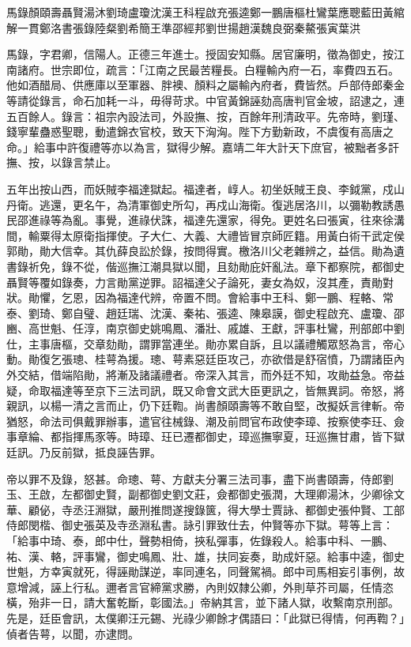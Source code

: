 
\begin{pinyinscope}
馬錄顏頤壽聶賢湯沐劉琦盧瓊沈漢王科程啟充張逵鄭一鵬唐樞杜鸞葉應聰藍田黃綰解一貫鄭洛書張錄陸粲劉希簡王準邵經邦劉世揚趙漢魏良弼秦鰲張寅葉洪

馬錄，字君卿，信陽人。正德三年進士。授固安知縣。居官廉明，徵為御史，按江南諸府。世宗即位，疏言：「江南之民最苦糧長。白糧輸內府一石，率費四五石。他如酒醋局、供應庫以至軍器、胖襖、顏料之屬輸內府者，費皆然。戶部侍郎秦金等請從錄言，命石加耗一斗，毋得苛求。中官黃錦誣劾高唐判官金坡，詔逮之，連五百餘人。錄言：祖宗內設法司，外設撫、按，百餘年刑清政平。先帝時，劉瑾、錢寧輩蠱惑聖聰，動遣錦衣官校，致天下洶洶。陛下方勤新政，不虞復有高唐之命。」給事中許復禮等亦以為言，獄得少解。嘉靖二年大計天下庶官，被黜者多訐撫、按，以錄言禁止。

五年出按山西，而妖賊李福達獄起。福達者，崞人。初坐妖賊王良、李鉞黨，戍山丹衛。逃還，更名午，為清軍御史所勾，再戍山海衛。復逃居洛川，以彌勒教誘愚民邵進祿等為亂。事覺，進祿伏誅，福達先還家，得免。更姓名曰張寅，往來徐溝間，輸粟得太原衛指揮使。子大仁、大義、大禮皆冒京師匠籍。用黃白術干武定侯郭勛，勛大信幸。其仇薛良訟於錄，按問得實。檄洛川父老雜辨之，益信。勛為遺書錄祈免，錄不從，偕巡撫江潮具獄以聞，且劾勛庇奸亂法。章下都察院，都御史聶賢等覆如錄奏，力言勛黨逆罪。詔福達父子論死，妻女為奴，沒其產，責勛對狀。勛懼，乞恩，因為福達代辨，帝置不問。會給事中王科、鄭一鵬、程輅、常泰、劉琦、鄭自璧、趙廷瑞、沈漢、秦祐、張逵、陳皋謨，御史程啟充、盧瓊、邵豳、高世魁、任淳，南京御史姚鳴鳳、潘壯、戚雄、王獻，評事杜鸞，刑部郎中劉仕，主事唐樞，交章劾勛，謂罪當連坐。勛亦累自訴，且以議禮觸眾怒為言，帝心動。勛復乞張璁、桂萼為援。璁、萼素惡廷臣攻己，亦欲借是舒宿憤，乃謂諸臣內外交結，借端陷勛，將漸及諸議禮者。帝深入其言，而外廷不知，攻勛益急。帝益疑，命取福達等至京下三法司訊，既又命會文武大臣更訊之，皆無異詞。帝怒，將親訊，以楊一清之言而止，仍下廷鞫。尚書顏頤壽等不敢自堅，改擬妖言律斬。帝猶怒，命法司俱戴罪辦事，遣官往械錄、潮及前問官布政使李璋、按察使李玨、僉事章綸、都指揮馬豕等。時璋、玨已遷都御史，璋巡撫寧夏，玨巡撫甘肅，皆下獄廷訊。乃反前獄，抵良誣告罪。

帝以罪不及錄，怒甚。命璁、萼、方獻夫分署三法司事，盡下尚書頤壽，侍郎劉玉、王啟，左都御史賢，副都御史劉文莊，僉都御史張潤，大理卿湯沐，少卿徐文華、顧佖，寺丞汪淵獄，嚴刑推問遂搜錄篋，得大學士賈詠、都御史張仲賢、工部侍郎閔楷、御史張英及寺丞淵私書。詠引罪致仕去，仲賢等亦下獄。萼等上言：「給事中琦、泰，郎中仕，聲勢相倚，挾私彈事，佐錄殺人。給事中科、一鵬、祐、漢、輅，評事鸞，御史鳴鳳、壯、雄，扶同妄奏，助成奸惡。給事中逵，御史世魁，方幸寅就死，得誣勛謀逆，率同連名，同聲駕禍。郎中司馬相妄引事例，故意增減，誣上行私。邇者言官締黨求勝，內則奴隸公卿，外則草芥司屬，任情恣橫，殆非一日，請大奮乾斷，彰國法。」帝納其言，並下諸人獄，收繫南京刑部。先是，廷臣會訊，太僕卿汪元錫、光祿少卿餘才偶語曰：「此獄已得情，何再鞫？」偵者告萼，以聞，亦逮問。


\end{pinyinscope}
